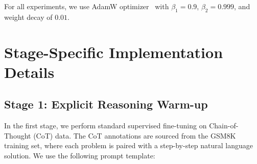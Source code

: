 \documentclass{article}
\theoremstyle{plain}
\theoremstyle{definition}
\theoremstyle{remark}
\begin{document}
\begin{table}[h]
\centering
{}
\caption{Training hyperparameters for different model scales. LR denotes learning rate and BS denotes batch size.}
\label{tab:training_hyperparams}
\end{table}

For all experiments, we use AdamW optimizer~\citep{loshchilov2018decoupled} with $\beta_1 = 0.9$, $\beta_2 = 0.999$, and weight decay of $0.01$.

\section{Stage-Specific Implementation Details}
\label{app:stage_details}

\subsection{Stage 1: Explicit Reasoning Warm-up}

In the first stage, we perform standard supervised fine-tuning on Chain-of-Thought (CoT) data. The CoT annotations are sourced from the GSM8K training set, where each problem is paired with a step-by-step natural language solution. We use the following prompt template:
\end{document}
